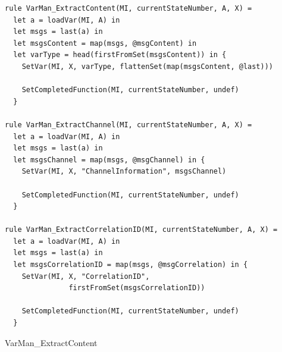 \begin{listing}[H]
\begin{verbatim}
rule VarMan_ExtractContent(MI, currentStateNumber, A, X) =
  let a = loadVar(MI, A) in
  let msgs = last(a) in
  let msgsContent = map(msgs, @msgContent) in
  let varType = head(firstFromSet(msgsContent)) in {
    SetVar(MI, X, varType, flattenSet(map(msgsContent, @last)))

    SetCompletedFunction(MI, currentStateNumber, undef)
  }

rule VarMan_ExtractChannel(MI, currentStateNumber, A, X) =
  let a = loadVar(MI, A) in
  let msgs = last(a) in
  let msgsChannel = map(msgs, @msgChannel) in {
    SetVar(MI, X, "ChannelInformation", msgsChannel)

    SetCompletedFunction(MI, currentStateNumber, undef)
  }

rule VarMan_ExtractCorrelationID(MI, currentStateNumber, A, X) =
  let a = loadVar(MI, A) in
  let msgs = last(a) in
  let msgsCorrelationID = map(msgs, @msgCorrelation) in {
    SetVar(MI, X, "CorrelationID",
               firstFromSet(msgsCorrelationID))

    SetCompletedFunction(MI, currentStateNumber, undef)
  }
\end{verbatim}
\caption{VarMan\_ExtractContent}
\label{lst:asm:VarMan_ExtractContent}
\end{listing}




